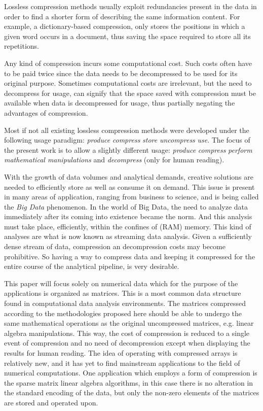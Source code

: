 \documentclass[10pt]{article}
\begin{document}
Lossless compression methods usually exploit redundancies present in the data in order to find a shorter form of describing the same information content. For example, a dictionary-based compression, only stores the positions in which a given word occurs in a document, thus saving the space required to store all its repetitions\cite{salomon2}. 

Any kind of compression incurs some computational cost. Such costs often have to be paid twice since the data needs to be decompressed to be used for its original purpose. Sometimes computational costs are irrelevant, but the need to decompress for usage, can signify that the space saved with compression must be available when data is decompressed for usage, thus partially negating the advantages of compression.

Most if not all existing lossless compression methods were developed under the following usage paradigm: \textit{produce}  \textit{compress}  \textit{store}  \textit{uncompress}  \textit{use}. The focus of the present work is to allow a slightly different usage:  \textit{produce}  \textit{compress}  \textit{perform mathematical manipulations} and \textit{decompress} (only for human reading).

With the growth of data volumes and analytical demands, creative solutions are needed to efficiently store as well as consume it on demand. This issue is present in many areas of application, ranging from business to science\cite{lynch}, and is being called the \textit{Big Data} phenomenon. In the world of Big Data, the need to analyze data immediately after its coming into existence became the norm. And this analysis must take place, efficiently, within the confines of (RAM) memory. This kind of analyses are what is now known as streaming data analysis\cite{gaber2005mining}. Given a sufficiently dense stream of data, compression an decompression costs may become prohibitive. So having a way to compress data and keeping it compressed for the entire course of the analytical pipeline, is very desirable.

This paper will focus solely on numerical data which for the purpose of the applications is organized as   matrices. This is a most common data structure found in computational data analysis environments. The matrices compressed according to the methodologies proposed here should be able to undergo the same mathematical operations as the original uncompressed matrices, e.g. linear algebra manipulations. This way, the cost of compression is reduced to a single event of compression and no need of decompression except when displaying the results for human reading. The idea of operating with compressed arrays is relatively new\cite{yemliha2007compiler}, and it has yet to find mainstream applications to the field of numerical computations. One application which employs a form of compression is the sparse matrix linear algebra algorithms\cite{dodson1991sparse}, in this case there is no alteration in the standard encoding of the data, but only the non-zero elements of the matrices are stored and operated upon. 
\end{document}
